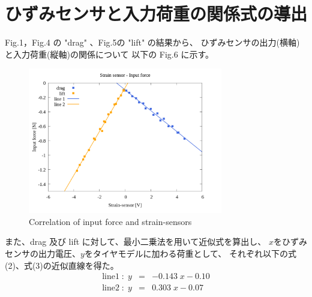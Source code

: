 \documentclass[twocolumn,a4j]{jsarticle}
\begin{document}
\section{ひずみセンサと入力荷重の関係式の導出}
Fig.1，Fig.4 の "drag" 、Fig.5の "lift" の結果から、
ひずみセンサの出力(横軸)と入力荷重(縦軸)の関係について
以下の Fig.6 に示す。\par
\begin{figure}[htbp]
    \footnotesize
    \begin{center}
        \includegraphics[width=85mm]{images/08_strainsensor-forces&line.png}
        \caption{Correlation of input force and strain-sensors}
    \end{center}
\end{figure}
また、drag 及び lift に対して、最小二乗法を用いて近似式を算出し、
$x$をひずみセンサの出力電圧、$y$をタイヤモデルに加わる荷重として、
それぞれ以下の式(2)、式(3)の近似直線を得た。
\begin{eqnarray}
    \mathrm{line 1} \; : \; y &=& -0.143 \; x - 0.10\\
    \mathrm{line 2} \; : \; y &=& 0.303 \; x - 0.07
\end{eqnarray}
\end{document}
